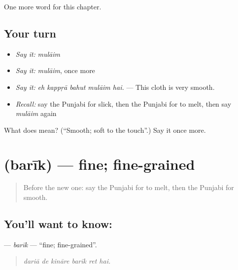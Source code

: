\begin{grammarlens}[title={What you've built}]
One more word for this chapter.
\end{grammarlens}

\subsection*{Your turn}
\begin{itemize}
\raggedright
  \item \emph{Say it:} \emph{mulāim}
  \item \emph{Say it:} \emph{mulāim}, once more
  \item \emph{Say it:} \emph{eh kappṛā bahut mulāim hai.} — This cloth is very smooth.
  \item \emph{Recall:} say the Punjabi for slick, then the Punjabi for to melt, then say \emph{mulāim} again
\end{itemize}

\begin{tcolorbox}[breakable,colback=teal!4,colframe=teal!35!black,title={Before you move on}]
What does  mean? (\textquotedblleft{}Smooth; soft to the touch\textquotedblright{}.) Say it once more.
\end{tcolorbox}
\section[\texorpdfstring{\pa{ਬਰੀਕ} (barīk)}{ਬਰੀਕ (barīk)}]{ (barīk) — fine; fine-grained}

\label{lesson:PA-C297-barik}



\begin{quote}
Before the new one: say the Punjabi for to melt, then the Punjabi for smooth.
\end{quote}

\subsection*{You'll want to know: }
\textbf{} — \emph{barīk} — \textquotedblleft{}fine; fine-grained\textquotedblright{}.

\begin{quote}
     
\end{quote}

\begin{quote}
\emph{dariā de kināre barīk ret hai.}
\end{quote}

